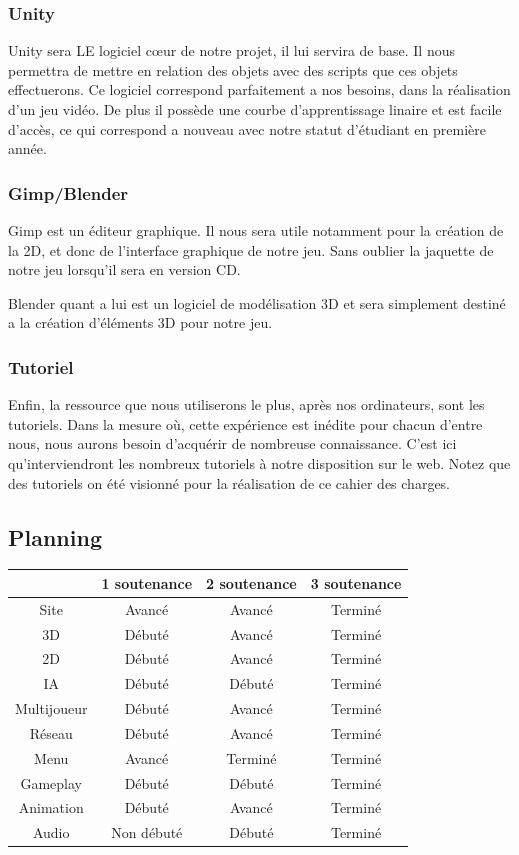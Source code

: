 \documentclass[a4paper, 12pt]{article}
\begin{document}
	\subsubsection{Unity}
	Unity sera LE logiciel cœur de notre projet, il lui servira de base. Il nous permettra de mettre en relation des objets avec des scripts que ces objets effectuerons. Ce logiciel correspond parfaitement a nos besoins, dans la réalisation d'un jeu vidéo. De plus il possède une courbe d'apprentissage linaire et est facile d'accès, ce qui correspond a nouveau avec notre statut d'étudiant en première année.
	\subsubsection{Gimp/Blender}
	Gimp est un éditeur graphique. Il nous sera utile notamment pour la création de la 2D, et donc de l'interface graphique de notre jeu. Sans oublier la jaquette de notre jeu lorsqu'il sera en version CD.
	\par Blender quant a lui est un logiciel de modélisation 3D et sera simplement destiné a la création d'éléments 3D pour notre jeu. 
	\subsubsection{Tutoriel}
	Enfin, la ressource que nous utiliserons le plus, après nos ordinateurs, sont les tutoriels. Dans la mesure où, cette expérience est inédite pour chacun d'entre nous, nous aurons besoin d'acquérir de nombreuse connaissance. C'est ici qu'interviendront les nombreux tutoriels à notre disposition sur le web. Notez que des tutoriels on été visionné pour la réalisation de ce cahier des charges.
\subsection{Planning}
	\begin{tabular}{|c||c|c|c|}
		\hline
		& 1\iere{} soutenance & 2\ieme{} soutenance & 3\ieme{} soutenance \\
		\hline
		Site &  Avancé & Avancé & Terminé \\
		\hline
		3D & Débuté & Avancé & Terminé \\
		\hline
		2D & Débuté & Avancé & Terminé \\
		\hline
		IA & Débuté & Débuté & Terminé\\
		\hline
		Multijoueur & Débuté & Avancé & Terminé\\
		\hline
		Réseau & Débuté & Avancé & Terminé\\
		\hline
		Menu & Avancé & Terminé & Terminé \\
		\hline
		Gameplay & Débuté & Débuté & Terminé\\
		\hline
		Animation & Débuté & Avancé & Terminé\\		
		\hline
		Audio & Non débuté & Débuté & Terminé\\
		\hline		
	\end{tabular}\\
	\newpage
\end{document}
